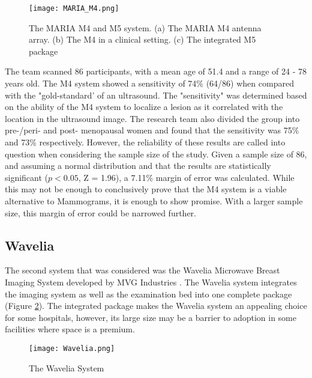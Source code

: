 \begin{figure}
    \texttt{[image: MARIA\_M4.png]}
    \centering
    \caption{The MARIA M4 and M5 system. (a) The MARIA M4 antenna array. (b) The M4 in a clinical setting. (c) The integrated M5 package \cite{preeceMARIAM4Clinical2016}}
    \label{fig:MARIAM4}
\end{figure}

\noindent The team scanned 86 participants, with a mean age of 51.4 and a range of 24 - 78 years old. The M4 system showed a sensitivity of
74\% (64/86) when compared with the "gold-standard' of an ultrasound. The "sensitivity" was determined based on the
ability of the M4 system to localize a lesion as it correlated with the location in the ultrasound image. The research
team also divided the group into pre-/peri- and post- menopausal women and found that the sensitivity was 75\% and 73\%
respectively. However, the reliability of these results are called into question when considering the sample size of the
study. Given a sample size of 86, and assuming a normal distribution and that the results are statistically significant
($p < 0.05$, Z = 1.96), a 7.11\% margin of error was calculated. While this may not be enough to conclusively prove
that the M4 system is a viable alternative to Mammograms, it is enough to show promise. With a larger sample size, this
margin of error could be narrowed further.

\subsection{Wavelia}
The second system that was considered was the Wavelia Microwave Breast Imaging System developed by MVG Industries
\cite{moloneyWaveliaMicrowaveBreast2021}. The Wavelia system integrates the imaging system as well as the examination
bed into one complete package (Figure \ref{fig:WaveliaSystem}). The integrated package makes the Wavelia system an
appealing choice for some hospitals, however, its large size may be a barrier to adoption in some facilities where space
is a premium. \hfill \break

\begin{figure}
    \texttt{[image: Wavelia.png]}
    \centering
    \caption{The Wavelia System \cite{moloneyWaveliaMicrowaveBreast2021}}
    \label{fig:WaveliaSystem}
\end{figure}

